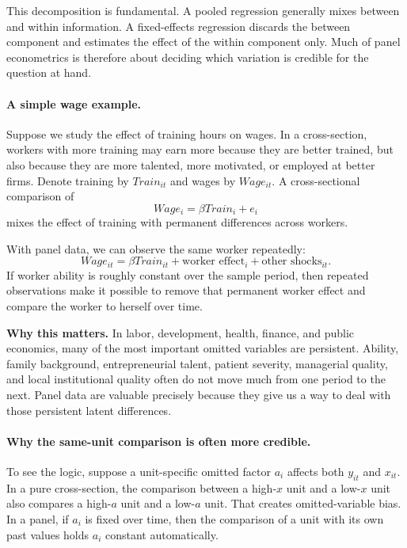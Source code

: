 This decomposition is fundamental. A pooled regression generally mixes between and within information. A fixed-effects regression discards the between component and estimates the effect of the within component only. Much of panel econometrics is therefore about deciding which variation is credible for the question at hand.

\paragraph{A simple wage example.}
Suppose we study the effect of training hours on wages. In a cross-section, workers with more training may earn more because they are better trained, but also because they are more talented, more motivated, or employed at better firms. Denote training by $Train_{it}$ and wages by $Wage_{it}$. A cross-sectional comparison of
\[
Wage_i = \beta Train_i + e_i
\]
mixes the effect of training with permanent differences across workers.

With panel data, we can observe the same worker repeatedly:
\[
Wage_{it} = \beta Train_{it} + \text{worker effect}_i + \text{other shocks}_{it}.
\]
If worker ability is roughly constant over the sample period, then repeated observations make it possible to remove that permanent worker effect and compare the worker to herself over time.

\begin{boxD}
\textbf{Why this matters.}
In labor, development, health, finance, and public economics, many of the most important omitted variables are persistent. Ability, family background, entrepreneurial talent, patient severity, managerial quality, and local institutional quality often do not move much from one period to the next. Panel data are valuable precisely because they give us a way to deal with those persistent latent differences.
\end{boxD}

\paragraph{Why the same-unit comparison is often more credible.}
To see the logic, suppose a unit-specific omitted factor $a_i$ affects both $y_{it}$ and $x_{it}$. In a pure cross-section, the comparison between a high-$x$ unit and a low-$x$ unit also compares a high-$a$ unit and a low-$a$ unit. That creates omitted-variable bias. In a panel, if $a_i$ is fixed over time, then the comparison of a unit with its own past values holds $a_i$ constant automatically.

